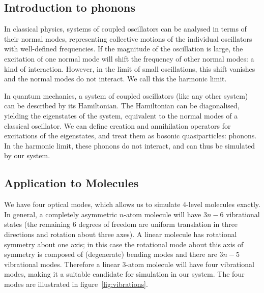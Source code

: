 \subsection{Introduction to phonons}
\label{sec:Phonons}
In classical physics, systems of coupled oscillators can be analysed in terms of
their normal modes, representing collective motions of the individual
oscillators with well-defined frequencies. If the magnitude of the oscillation
is large, the excitation of one normal mode will shift the frequency of other
normal modes: a kind of interaction. However, in the limit of small
oscillations, this shift vanishes and the normal modes do not interact. We call
this the harmonic limit.

In quantum mechanics, a system of coupled oscillators (like any other system)
can be described by its Hamiltonian. The Hamiltonian can be diagonalised,
yielding the eigenstates of the system, equivalent to the normal modes of a
classical oscillator. We can define creation and annihilation operators for
excitations of the eigenstates, and treat them as bosonic quasiparticles:
phonons. In the harmonic limit, these phonons do not interact, and can thus be
simulated by our system.

\subsection{Application to Molecules}
We have four optical modes, which allows us to simulate 4-level molecules
exactly. In general, a completely asymmetric \(n\)-atom molecule will have \(3
n-6\) vibrational states (the remaining 6 degrees of freedom are
uniform translation in three directions and rotation about three axes). A linear
molecule has rotational symmetry about one axis; in this case the rotational
mode about this axis of symmetry is composed of (degenerate) bending modes and
there are \(3n - 5\) vibrational modes. Therefore a linear 3-atom molecule will
have four vibrational modes, making it a suitable candidate for simulation in
our system. The four modes are illustrated in figure~\ref{fig:vibrations}.

